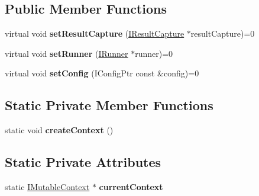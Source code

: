 \subsection*{Public Member Functions}
\begin{DoxyCompactItemize}
\item 
\mbox{\label{structCatch_1_1IMutableContext_a4a80afd0525b7def21bee8d9b48f2d39}} 
virtual void {\bfseries set\+Result\+Capture} (\hyperlink{structCatch_1_1IResultCapture}{I\+Result\+Capture} $\ast$result\+Capture)=0
\item 
\mbox{\label{structCatch_1_1IMutableContext_af2e53b1dea4527a2587cff266a730f6e}} 
virtual void {\bfseries set\+Runner} (\hyperlink{structCatch_1_1IRunner}{I\+Runner} $\ast$runner)=0
\item 
\mbox{\label{structCatch_1_1IMutableContext_aa81ba080fce084e9482f20338bc88531}} 
virtual void {\bfseries set\+Config} (I\+Config\+Ptr const \&config)=0
\end{DoxyCompactItemize}
\subsection*{Static Private Member Functions}
\begin{DoxyCompactItemize}
\item 
\mbox{\label{structCatch_1_1IMutableContext_a17e4b3f9a9674af7e2c4f081c692a628}} 
static void {\bfseries create\+Context} ()
\end{DoxyCompactItemize}
\subsection*{Static Private Attributes}
\begin{DoxyCompactItemize}
\item 
\mbox{\label{structCatch_1_1IMutableContext_aca4de034d0deed74dba34f143e4e273e}} 
static \hyperlink{structCatch_1_1IMutableContext}{I\+Mutable\+Context} $\ast$ {\bfseries current\+Context}
\end{DoxyCompactItemize}
